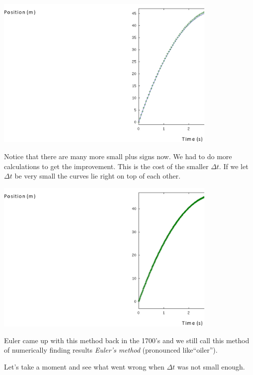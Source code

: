 \documentclass[twoside,11pt,ShortChapTitles]{BYUTextbook}
\begin{document}
 
\begin{center}
\includegraphics[width=0.8\textwidth]{Lab7_figs/MLQ2XV08.png}
\end{center}
Notice that there are many more small plus signs now. We had to do more
calculations to get the improvement. This is the cost of the smaller $\Delta
t.$ If we let $\Delta t$ be very small the curves lie right on top of each other.

 
\begin{center}
\includegraphics[width=0.8\textwidth]{Lab7_figs/MLQ2XV09.png}
\end{center}
Euler came up with this method back in the 1700's and we still call this
method of numerically finding results \emph{Euler's method} (pronounced
like\textquotedblleft oiler\textquotedblright).

Let's take a moment and see what went wrong when $\Delta t$ was not small enough.
\end{document}
